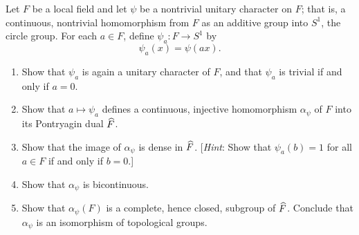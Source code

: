 %
%

\begin{exercise}[1]
  \label{ex:ch7-1}
  Let $F$ be a local field and let $\psi$ be a nontrivial unitary character on
  $F$; that is, a continuous, nontrivial homomorphism from $F$ as an additive
  group into $S^1$, the circle group. For each $a \in F$, define
  $\psi_a \colon F \to S^1$ by
  \[
    \psi_a(x) = \psi(ax).
  \]
  \begin{enumerate}[label=(\alph*)]
    \item Show that $\psi_a$ is again a unitary character of $F$, and that
      $\psi_a$ is trivial if and only if $a = 0$.
    \item Show that $a \mapsto \psi_a$ defines a continuous, injective
      homomorphism $\alpha_\psi$ of $F$ into its Pontryagin dual $\widehat{F}$.
    \item Show that the image of $\alpha_\psi$ is dense in $\widehat{F}$.
      [\emph{Hint}: Show that $\psi_a(b) = 1$ for all $a \in F$ if and only if
      $b = 0$.]
    \item Show that $\alpha_\psi$ is bicontinuous.
    \item Show that $\alpha_\psi(F)$ is a complete, hence closed, subgroup of
      $\widehat{F}$. Conclude that $\alpha_\psi$ is an isomorphism of topological
      groups.
  \end{enumerate}
\end{exercise}

